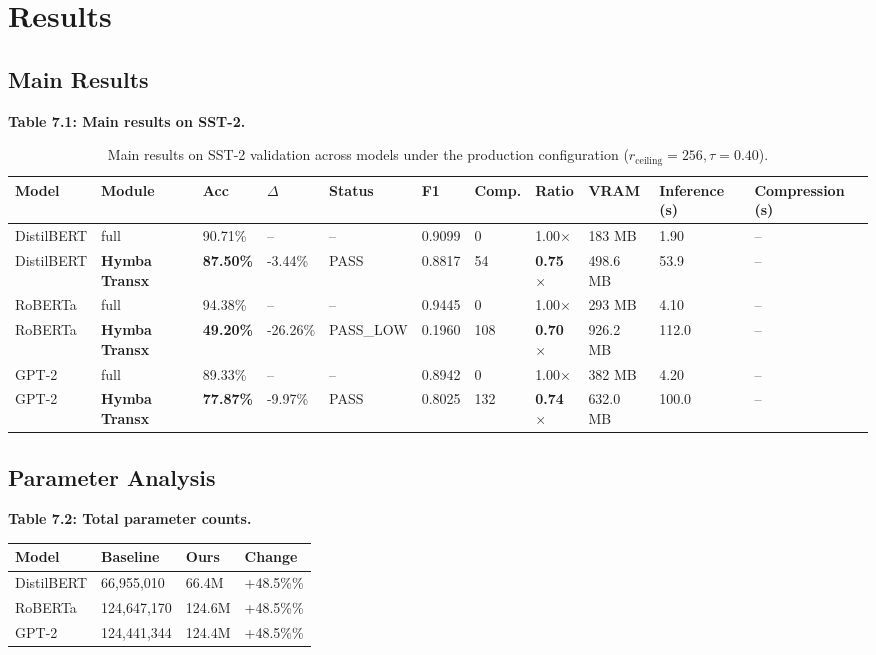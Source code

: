 \section{Results}

\subsection{Main Results}

\textbf{Table 7.1: Main results on SST-2.}

\begin{table}[t]
\centering
\small
\begin{tabular}{lllllllllll}
\toprule
\textbf{Model} & \textbf{Module} & \textbf{Acc} & \textbf{$\Delta$} & \textbf{Status} & \textbf{F1} & \textbf{Comp.} & \textbf{Ratio} & \textbf{VRAM} & \textbf{Inference (s)} & \textbf{Compression (s)} \\
\midrule
DistilBERT & full & 90.71\% & -- & -- & 0.9099 & 0 & 1.00$\times$ & 183 MB & 1.90 & -- \\
DistilBERT & \textbf{Hymba Transx} & \textbf{87.50\%} & -3.44\% & PASS & 0.8817 & 54 & \textbf{0.75$\times$} & 498.6 MB & 53.9 & -- \\
RoBERTa & full & 94.38\% & -- & -- & 0.9445 & 0 & 1.00$\times$ & 293 MB & 4.10 & -- \\
RoBERTa & \textbf{Hymba Transx} & \textbf{49.20\%} & -26.26\% & PASS\_LOW & 0.1960 & 108 & \textbf{0.70$\times$} & 926.2 MB & 112.0 & -- \\
GPT-2 & full & 89.33\% & -- & -- & 0.8942 & 0 & 1.00$\times$ & 382 MB & 4.20 & -- \\
GPT-2 & \textbf{Hymba Transx} & \textbf{77.87\%} & -9.97\% & PASS & 0.8025 & 132 & \textbf{0.74$\times$} & 632.0 MB & 100.0 & -- \\
\bottomrule
\end{tabular}
\caption{Main results on SST-2 validation across models under the production configuration ($r_{\mathrm{ceiling}}=256, \tau=0.40$).}
\label{tab:main_sst2}
\end{table}

\subsection{Parameter Analysis}

\textbf{Table 7.2: Total parameter counts.}

\begin{table}[H]
\centering
\small
\begin{tabular}{llll}
\toprule
\textbf{Model} & \textbf{Baseline} & \textbf{Ours} & \textbf{Change} \\
\midrule
DistilBERT & 66,955,010 & 66.4M & +48.5\%\% \\
RoBERTa & 124,647,170 & 124.6M & +48.5\%\% \\
GPT-2 & 124,441,344 & 124.4M & +48.5\%\% \\
\bottomrule
\end{tabular}
\end{table}

